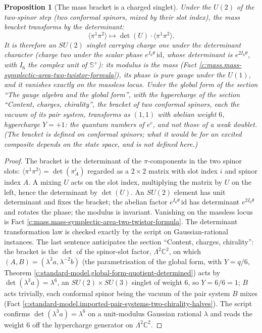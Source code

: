 \documentclass[11pt]{article}
\newtheorem{proposition}[theorem]{Proposition}
\theoremstyle{definition}
\theoremstyle{plain}
\newcommand{\changedmark}[2]{\marginpar{\raggedright\scriptsize\color{#1}#2}}
\providecommand{\C}{}\renewcommand{\C}{\mathbb{C}}
\providecommand{\CS}{}\renewcommand{\CS}{{\mathbb{S}^{+}}}
\providecommand{\id}{}\renewcommand{\id}{\mathrm{id}}
\providecommand{\br}{}\renewcommand{\br}[1]{\langle #1\rangle}
\begin{document}
\begin{proposition}[The mass bracket is a charged singlet]\label{c:standard-model.mass-bracket-charged-singlet}
\changedmark{gray}{reworded}
Under the $U(2)$ of the two-spinor step (two conformal spinors, mixed by their slot index), the mass bracket transforms by the determinant:
\[
\br{\pi^{1}\pi^{2}} \mapsto \det(U) \cdot \br{\pi^{1}\pi^{2}}.
\]
It is therefore an $SU(2)$ singlet carrying charge one under the determinant character (charge two under the scalar phase $e^{I_{6}\theta}\,\id$, whose determinant is $e^{2I_{6}\theta}$, with $I_{6}$ the complex unit of $\CS$): its modulus is the mass (Fact \ref{c:mass.mass-symplectic-area-two-twistor-formula}), its phase is pure gauge under the $U(1)$, and it vanishes exactly on the massless locus. Under the global form of the section ``The gauge algebra and the global form'', with the hypercharge of the section ``Content, charges, chirality'', the bracket of two conformal spinors, each the vacuum of its pair system, transforms as $(1, 1)$ with abelian weight $6$, hypercharge $Y = +1$: the quantum numbers of $e^{c}$, and not those of a weak doublet. (The bracket is defined on conformal spinors; what it would be for an excited composite depends on the state space, and is not defined here.)
\end{proposition}
\begin{proof}
The bracket is the determinant of the $\pi$-components in the two spinor slots: $\br{\pi^{1}\pi^{2}} = \det(\pi^{i}_{A})$ regarded as a $2 \times 2$ matrix with slot index $i$ and spinor index $A$. A mixing $U$ acts on the slot index, multiplying the matrix by $U$ on the left, hence the determinant by $\det(U)$. An $SU(2)$ element has unit determinant and fixes the bracket; the abelian factor $e^{I_{6}\theta}\,\id$ has determinant $e^{2I_{6}\theta}$ and rotates the phase; the modulus is invariant. Vanishing on the massless locus is Fact \ref{c:mass.mass-symplectic-area-two-twistor-formula}. The determinant transformation law is checked exactly by the script on Gaussian-rational instances. The last sentence anticipates the section ``Content, charges, chirality'': the bracket is the $\det$ of the spinor-slot factor, $\Lambda^{2}\C^{2}$, on which $(A, B) = (\lambda^{3}a, \lambda^{-2}b)$ (the parametrisation of the global form, with $Y = q/6$, Theorem \ref{c:standard-model.global-form-quotient-determined}) acts by $\det(\lambda^{3}a) = \lambda^{6}$, an $SU(2) \times SU(3)$ singlet of weight $6$, so $Y = 6/6 = 1$; $B$ acts trivially, each conformal spinor being the vacuum of the pair system $B$ mixes (Fact \ref{c:standard-model.imported-pair-systems-two-chirality-halves}). The script confirms $\det(\lambda^{3}a) = \lambda^{6}$ on a unit-modulus Gaussian rational $\lambda$ and reads the weight $6$ off the hypercharge generator on $\Lambda^{2}\C^{2}$.

\end{proof}
\end{document}
